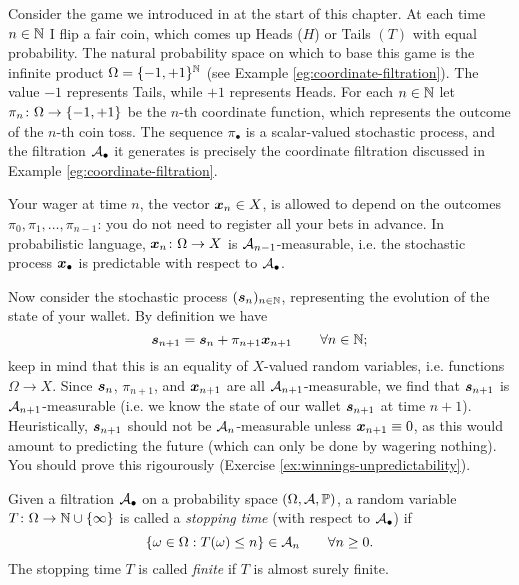 \begin{example}\label{eg:gambling-filtrations}
  Consider the game we introduced in at the start of this chapter.
  At each time $n \in \mathbb{N}$ I flip a fair coin, which comes up Heads ($H$) or Tails $(T)$ with equal probability.
  The natural probability space on which to base this game is the infinite product $\Omega = \{-1,+1\}^{\mathbb{N}}$ (see Example \ref{eg:coordinate-filtration}).
  The value $-1$ represents Tails, while $+1$ represents Heads.
  For each $n \in \mathbb{N}$ let $\pi_n \colon \Omega \rightarrow \{-1,+1\}$ be the $n$-th coordinate function, which represents the outcome of the $n$-th coin toss.
  The sequence $\pi_{\bullet}$ is a scalar-valued stochastic process, and the filtration $\mathcal{A}_{\bullet}$ it generates is precisely the coordinate filtration discussed in Example \ref{eg:coordinate-filtration}.

  
  Your wager at time $n$, the vector $\bm{x}_n \in X$, is allowed to depend on the outcomes $\pi_0, \pi_1, \ldots, \pi_{n-1}$: you do not need to register all your bets in advance.
  In probabilistic language, $\bm{x}_n \colon \Omega \rightarrow X$ is $\mathcal{A}_{n-1}$-measurable, i.e. the stochastic process $\bm{x}_{\bullet}$ is predictable with respect to $\mathcal{A}_{\bullet}$.

  Now consider the stochastic process $(\bm{s}_n)_{n \in \mathbb{N}}$, representing the evolution of the state of your wallet.
  By definition we have
  \begin{equation*}
    \bm{s}_{n+1} = \bm{s}_n + \pi_{n+1} \bm{x}_{n+1} \qquad \forall n \in \mathbb{N};
  \end{equation*}
  keep in mind that this is an equality of $X$-valued random variables, i.e. functions $\Omega \to X$.
  Since $\bm{s}_n$, $\pi_{n+1}$, and $\bm{x}_{n+1}$ are all $\mathcal{A}_{n+1}$-measurable, we find that $\bm{s}_{n+1}$ is $\mathcal{A}_{n+1}$-measurable (i.e. we know the state of our wallet $\bm{s}_{n+1}$ at time $n+1$).
  Heuristically, $\bm{s}_{n+1}$ should not be $\mathcal{A}_n$-measurable unless $\bm{x}_{n+1} \equiv 0$, as this would amount to predicting the future (which can only be done by wagering nothing).
  You should prove this rigourously (Exercise \ref{ex:winnings-unpredictability}).
\end{example}

\begin{defn}\label{defn:stopping-time}
  Given a filtration $\mathcal{A}_\bullet$ on a probability space $(\Omega, \mathcal{A}, \mathbb{P})$, a random variable $T \colon \Omega \rightarrow \mathbb{N} \cup \{\infty\}$ is called a \emph{stopping time} (with respect to $\mathcal{A}_{\bullet}$) if 
  \begin{equation*}
    \{\omega \in \Omega: T(\omega) \leq n\} \in \mathcal{A}_n \qquad \forall n \geq 0.
  \end{equation*}
  The stopping time $T$ is called \emph{finite} if $T$ is almost surely finite.
\end{defn}

